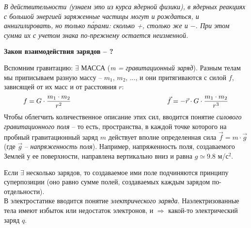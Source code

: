 {\em В действительности (узнаем это из курса ядерной физики), в ядерных реакциях с большой энергией заряженные частицы могут и рождаться, и аннигилировать, но только п\'{а}рами: сколько +, столько же и $-$. При этом сумма их с учетом знака по-прежнему остается неизменной.}


\centerline{\bf Закон взаимодействия зарядов -- ?}
Вспомним гравитацию:  $\exists$ МАССА ({\em m =  гравитационный заряд}). Разным телам мы приписываем разную массу -- $m_1$, $m_2$, ..., и они при\-тя\-ги\-ва\-ют\-ся с силой $f$, зависящей от их масс и от расстояния $r$:
\begin{displaymath}
 f=G\cdot\frac{m_1\cdot m_2}{r^2}\hspace{50mm}\vec{f}=-\vec{r}\cdot G\cdot\frac{m_1\cdot m_2}{r^3}
\end{displaymath}
Чтобы облегчить количественное описание этих сил, вводится понятие {\em сило\-вого гравитационного поля} -- то есть, пространства, в каждой точке которого на пробный гравитационный заряд $m$ действует вполне определен\-ная сила $\vec{f}=m\cdot \vec{g}$ (где $\vec{g}$ -- {\em напряженность поля}). Например, напряженность поля, создаваемого Землей у ее поверхности, направлена вертикально вниз и равна $g\simeq9.8$ м/с$^2$.

Если $\exists$ несколько зарядов,  то создаваемое ими поле подчиняются прин\-ци\-пу суперпозиции (оно равно сумме полей, создаваемых каждым зарядом по-отдельности).\\[5mm]

В электростатике вводится понятие {\em электрического заряда}. Наэлек\-три\-зо\-ванные тела имеют избыток или недостаток электронов, и $\Rightarrow$ какой-то электрический заряд $q$.


